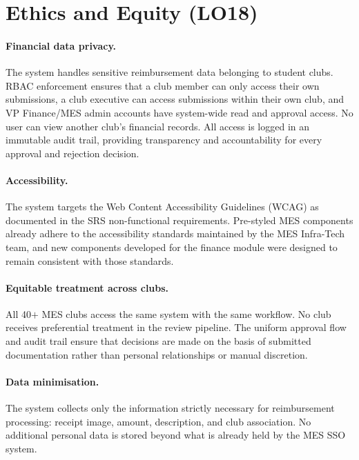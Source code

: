 \documentclass{article}
\begin{document}
\section{Ethics and Equity (LO18)}

\paragraph{Financial data privacy.}
The system handles sensitive reimbursement data belonging to student clubs.
RBAC enforcement ensures that a club member can only access their own
submissions, a club executive can access submissions within their own club,
and VP Finance/MES admin accounts have system-wide read and approval access.
No user can view another club's financial records.  All access is logged
in an immutable audit trail, providing transparency and accountability for
every approval and rejection decision.

\paragraph{Accessibility.}
The system targets the Web Content Accessibility Guidelines (WCAG) as
documented in the SRS non-functional requirements.  Pre-styled MES
components already adhere to the accessibility standards maintained by the
MES Infra-Tech team, and new components developed for the finance module
were designed to remain consistent with those standards.

\paragraph{Equitable treatment across clubs.}
All 40$+$ MES clubs access the same system with the same workflow.  No
club receives preferential treatment in the review pipeline.  The uniform
approval flow and audit trail ensure that decisions are made on the basis
of submitted documentation rather than personal relationships or manual
discretion.

\paragraph{Data minimisation.}
The system collects only the information strictly necessary for
reimbursement processing: receipt image, amount, description, and club
association.  No additional personal data is stored beyond what is already
held by the MES SSO system.
\end{document}
